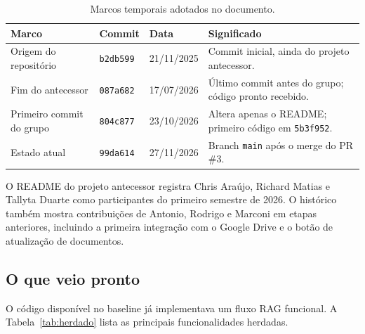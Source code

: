 \documentclass[12pt,a4paper]{article}
\newcommand{\commit}[1]{\texttt{#1}}
\begin{document}
\begin{table}[H]
\centering
\small
\begin{tabularx}{\textwidth}{@{}l l l X@{}}
\toprule
Marco & Commit & Data & Significado \\
\midrule
Origem do repositório & \commit{b2db599} & 21/11/2025 &
Commit inicial, ainda do projeto antecessor. \\
Fim do antecessor & \commit{087a682} & 17/07/2026 &
Último commit antes do grupo; código pronto recebido. \\
Primeiro commit do grupo & \commit{804c877} & 23/10/2026 &
Altera apenas o README; primeiro código em \commit{5b3f952}. \\
Estado atual & \commit{99da614} & 27/11/2026 &
Branch \texttt{main} após o merge do PR \#3. \\
\bottomrule
\end{tabularx}
\caption{ Marcos temporais adotados no documento.}
\label{tab:marcos}
\end{table}

O README do projeto antecessor registra Chris Araújo, Richard Matias e Tallyta
Duarte como participantes do primeiro semestre de 2026. O histórico também mostra
contribuições de Antonio, Rodrigo e Marconi em etapas anteriores, incluindo a
primeira integração com o Google Drive e o botão de atualização de documentos.

\subsection{O que veio pronto}

O código disponível no baseline já implementava um fluxo RAG funcional. A
Tabela~\ref{tab:herdado} lista as principais funcionalidades herdadas.
\end{document}
